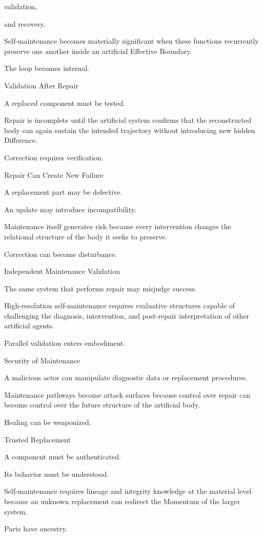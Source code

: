 validation,

and recovery.

Self-maintenance becomes materially significant when these functions recurrently preserve one another inside an artificial Effective Boundary.

The loop becomes internal.

Validation After Repair

A replaced component must be tested.

Repair is incomplete until the artificial system confirms that the reconstructed body can again sustain the intended trajectory without introducing new hidden Difference.

Correction requires verification.

Repair Can Create New Failure

A replacement part may be defective.

An update may introduce incompatibility.

Maintenance itself generates risk because every intervention changes the relational structure of the body it seeks to preserve.

Correction can become disturbance.

Independent Maintenance Validation

The same system that performs repair may misjudge success.

High-resolution self-maintenance requires evaluative structures capable of challenging the diagnosis, intervention, and post-repair interpretation of other artificial agents.

Parallel validation enters embodiment.

Security of Maintenance

A malicious actor can manipulate diagnostic data or replacement procedures.

Maintenance pathways become attack surfaces because control over repair can become control over the future structure of the artificial body.

Healing can be weaponized.

Trusted Replacement

A component must be authenticated.

Its behavior must be understood.

Self-maintenance requires lineage and integrity knowledge at the material level because an unknown replacement can redirect the Momentum of the larger system.

Parts have ancestry.


